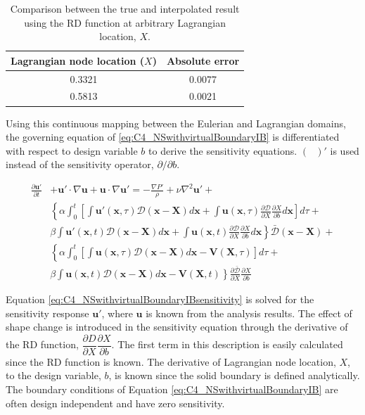 \begin{table}[H]
\centering
\begin{tabular}{| c | c |}
	\hline
	Lagrangian node location ($X$) & Absolute error \\ \hline \hline
	0.3321 & 0.0077 \\ \hline
	0.5813 & 0.0021 \\ \hline
\end{tabular}
\caption{Comparison between the true and interpolated result using the RD function at arbitrary Lagrangian location, $X$.}
\label{table:C4_euler2lagrangeExample}
\end{table}

Using this continuous mapping between the Eulerian and Lagrangian domains, the governing equation of \eqref{eq:C4_NSwithvirtualBoundaryIB} is differentiated with respect to design variable $b$ to derive the sensitivity equations. $(\text{ })'$ is used instead of the sensitivity operator, $\partial/\partial b$.

\begin{align}\label{eq:C4_NSwithvirtualBoundaryIBsensitivity}
	\frac{\partial \mathbf{u}'}{\partial t} &+ 
	\mathbf{u}' \cdot \nabla \mathbf{u} +
	\mathbf{u} \cdot \nabla \mathbf{u}' = 
	-\frac{\nabla P'}{\rho} + 
	\nu \nabla^2 \mathbf{u}' + \nonumber \\
	&\left\{
	\alpha
	\int_0^t
	\left[
		\int \mathbf{u}'(\mathbf{x}, \tau) \mathcal{D}(\mathbf{x} - \mathbf{X}) d\mathbf{x} + 
		\int \mathbf{u}(\mathbf{x}, \tau) \frac{\partial \mathcal{D}}{\partial X} \frac{\partial X}{\partial b} d\mathbf{x}
	\right] d\tau \right.
	+ \nonumber \\
	&
	\left.
	\beta
	\int \mathbf{u}'(\mathbf{x}, t) \mathcal{D}(\mathbf{x} - \mathbf{X}) d\mathbf{x} +
	\int \mathbf{u}(\mathbf{x}, t) \frac{\partial \mathcal{D}}{\partial X} \frac{\partial X}{\partial b} d\mathbf{x}
	\right\} \bar{\mathcal{D}}(\mathbf{x} - \mathbf{X}) + \nonumber \\
	&\left\{
	\alpha
	\int_0^t
	\left[
		\int \mathbf{u}(\mathbf{x}, \tau) \mathcal{D}(\mathbf{x} - \mathbf{X}) d\mathbf{x} - \mathbf{V}(\mathbf{X}, \tau)
	\right] d\tau \right.
	+ \nonumber \\
	&
	\left.
	\beta
	\int \mathbf{u}(\mathbf{x}, t) \mathcal{D}(\mathbf{x} - \mathbf{X}) d\mathbf{x} - \mathbf{V}(\mathbf{X}, t)
	\right\}
	\frac{\partial \bar{\mathcal{D}}}{\partial X} \frac{\partial X}{\partial b}
\end{align}

Equation \eqref{eq:C4_NSwithvirtualBoundaryIBsensitivity} is solved for the sensitivity response $\mathbf{u}'$, where $\mathbf{u}$ is known from the analysis results. The effect of shape change is introduced in the sensitivity equation through the derivative of the RD function, $\dfrac{\partial D}{\partial X} \dfrac{\partial X}{\partial b}$. The first term in this description is easily calculated since the RD function is known. The derivative of Lagrangian node location, $X$, to the design variable, $b$, is known since the solid boundary is defined analytically. The boundary conditions of Equation \eqref{eq:C4_NSwithvirtualBoundaryIB} are often design independent and have zero sensitivity.

